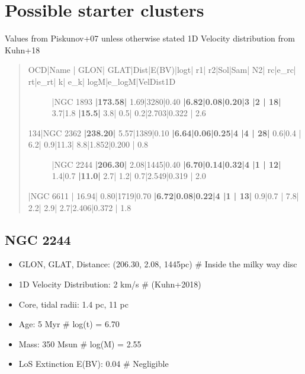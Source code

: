 \documentclass[letterpaper,10pt,english]{sphinxmanual}
\begin{document}
\section{Possible starter clusters}
\label{\detokenize{Project_Overview/MilkyWayClusters:possible-starter-clusters}}
\sphinxAtStartPar
Values from Piskunov+07 unless otherwise stated
1D Velocity distribution from Kuhn+18
\begin{quote}
\begin{description}
\item[{OCD|Name             |  GLON|   GLAT|Dist|E(B\sphinxhyphen{}V)|logt|  r1|  r2|Sol|Sam| N2|  rc|e\_rc|  rt|e\_rt|   k| e\_k| logM|e\_logM|VelDist1D}] \leavevmode
{}|NGC 1893         {\color{red}\bfseries{}|173.58|}  \sphinxhyphen{}1.69|3280|0.40  {\color{red}\bfseries{}|6.82|0.08|0.20|3  |2  | 18|} 3.7|1.8 {\color{red}\bfseries{}|15.5|} 3.8| 0.5| 0.2|2.703|0.322 |      2.6

\item[{134|NGC 2362         {\color{red}\bfseries{}|238.20|}  \sphinxhyphen{}5.57|1389|0.10  {\color{red}\bfseries{}|6.64|0.06|0.25|4  |4  | 28|} 0.6|0.4 | 6.2| 0.9|11.3| 8.8|1.852|0.200 |      0.8}] \leavevmode
{}|NGC 2244         {\color{red}\bfseries{}|206.30|}  \sphinxhyphen{}2.08|1445|0.40  {\color{red}\bfseries{}|6.70|0.14|0.32|4  |1  | 12|} 1.4|0.7 {\color{red}\bfseries{}|11.0|} 2.7| 1.2| 0.7|2.549|0.319 |      2.0

\end{description}

|NGC 6611         | 16.94|   0.80|1719|0.70  {\color{red}\bfseries{}|6.72|0.08|0.22|4  |1  | 13|} 0.9|0.7 | 7.8| 2.2| 2.9| 2.7|2.406|0.372 |      1.8
\end{quote}


\subsection{NGC 2244}
\label{\detokenize{Project_Overview/MilkyWayClusters:ngc-2244}}\begin{itemize}
\item {} 
\sphinxAtStartPar
GLON, GLAT, Distance: (206.30, \sphinxhyphen{}2.08, 1445pc)     \# Inside the milky way disc

\item {} 
\sphinxAtStartPar
1D Velocity Distribution: 2 km/s                  \# (Kuhn+2018)

\item {} 
\sphinxAtStartPar
Core, tidal radii: 1.4 pc, 11 pc

\item {} 
\sphinxAtStartPar
Age: 5 Myr                                        \# log(t) = 6.70

\item {} 
\sphinxAtStartPar
Mass: 350 Msun                                    \# log(M) = 2.55

\item {} 
\sphinxAtStartPar
LoS Extinction E(B\sphinxhyphen{}V): 0.04                       \# Negligible

\end{itemize}
\end{document}
